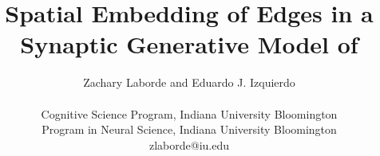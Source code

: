 \title{Spatial Embedding of Edges in a Synaptic Generative Model of \\
 \ce}

\author{Zachary Laborde and Eduardo J. Izquierdo\\
\mbox{}\\
Cognitive Science Program, Indiana University Bloomington\\
Program in Neural Science, Indiana University Bloomington\\
zlaborde@iu.edu}
